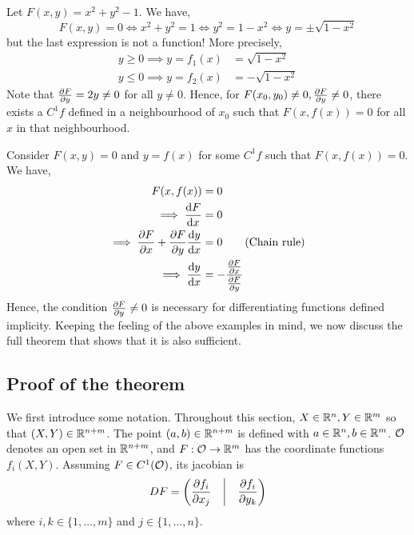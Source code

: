 \documentclass[../Analysis-3.tex]{subfiles}
\begin{document}
 \begin{Eg}{}{}
  Let \( F(x,y) = x^2 + y^2 - 1 \). We have,
  \[ 
   F(x,y) = 0 \iff x^2 + y^2 = 1 \iff y^2 = 1 - x^2 \iff y = \pm \sqrt{1-x^2} 
   \]
   but the last expression is not a function! More precisely,
   \begin{align*}
     y \geq 0 \implies y = f_1(x) &= \sqrt{1-x^2} \\
     y \leq 0 \implies y = f_2(x) &= - \sqrt{1-x^2}
   \end{align*}
   Note that \( \pdv{F}{y} = 2y \neq 0 \) for all \( y \neq 0 \). Hence, for \( F(x_0,y_0) \neq 0, \pdv{F}{y}(x_0, y_0) \neq 0 \), there exists a \( C^1 f \) defined in a neighbourhood of \( x_0  \) such that \( F(x,f(x)) = 0 \) for all \( x \) in that neighbourhood.
  \end{Eg}

  \begin{noteBox}{}{}
   Consider \( F(x,y) = 0 \) and \( y = f(x) \) for some \( C^1 f \) such that \( F(x,f(x)) = 0 \).
   We have,
   \begin{align*}
     F(x,f(x)) &= 0 \\
     \implies \dv{F}{x} &= 0 \\
     \implies \pdv{F}{x} + \pdv{F}{y}\dv{y}{x} &= 0 \tag{Chain rule} \\
     \implies \dv{y}{x} &= - \frac{\pdv{F}{x}}{\pdv{F}{y}}
   \end{align*}
   Hence, the condition \( \pdv{F}{y} \neq 0 \) is necessary for differentiating functions defined implicity. Keeping the feeling of the above examples in mind, we now discuss the full theorem that shows that it is also sufficient.
   \end{noteBox}

\subsection{Proof of the theorem}

We first introduce some notation. Throughout this section, \( X \in \mathbb{R}^n, Y \in \mathbb{R}^m \) so that \( (X,Y) \in \mathbb{R}^{n+m} \). The point \( (a,b) \in \mathbb{R}^{n+m} \) is defined with \( a \in \mathbb{R}^n, b \in \mathbb{R}^m \). \( \mathcal{O}_{} \) denotes an open set in \( \mathbb{R}^{n+m} \), and \( F: \mathcal{O}_{} \to \mathbb{R}^m \) has the coordinate functions \( f_i(X,Y) \). Assuming \( F \in C^1(\mathcal{O}_{}) \), its jacobian is
\[ 
 DF = \begin{pmatrix}
   \displaystyle\pdv{f_i}{x_j} & \bigg\vert & \displaystyle\pdv{f_i}{y_k} 
 \end{pmatrix} 
 \]
 where \( i,k \in \{1,\dots, m\} \) and \( j \in \{1,\dots, n\} \).
\end{document}
